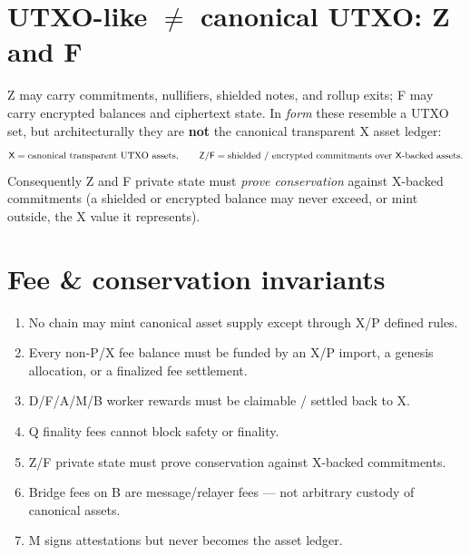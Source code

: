 \documentclass[11pt,letterpaper]{article}
\newcommand{\chain}[1]{\textsf{#1}}
\begin{document}
\section{UTXO-like $\neq$ canonical UTXO: Z and F}

\chain{Z} may carry commitments, nullifiers, shielded notes, and rollup exits;
\chain{F} may carry encrypted balances and ciphertext state. In \emph{form} these
resemble a UTXO set, but architecturally they are \textbf{not} the canonical
transparent \chain{X} asset ledger:
\[
\text{\chain{X}} = \text{canonical transparent UTXO assets}, \qquad
\text{\chain{Z}/\chain{F}} = \text{shielded / encrypted commitments over
\chain{X}-backed assets.}
\]
Consequently \chain{Z} and \chain{F} private state must \emph{prove conservation}
against \chain{X}-backed commitments (a shielded or encrypted balance may never
exceed, or mint outside, the \chain{X} value it represents).

\section{Fee \& conservation invariants}

\begin{enumerate}[label=\textbf{I\arabic*.}]
\item No chain may mint canonical asset supply except through \chain{X}/\chain{P}
defined rules.
\item Every non-\chain{P}/\chain{X} fee balance must be funded by an
\chain{X}/\chain{P} import, a genesis allocation, or a finalized fee settlement.
\item \chain{D}/\chain{F}/\chain{A}/\chain{M}/\chain{B} worker rewards must be
claimable / settled back to \chain{X}.
\item \chain{Q} finality fees cannot block safety or finality.
\item \chain{Z}/\chain{F} private state must prove conservation against
\chain{X}-backed commitments.
\item Bridge fees on \chain{B} are message/relayer fees --- not arbitrary custody
of canonical assets.
\item \chain{M} signs attestations but never becomes the asset ledger.
\end{enumerate}
\end{document}
